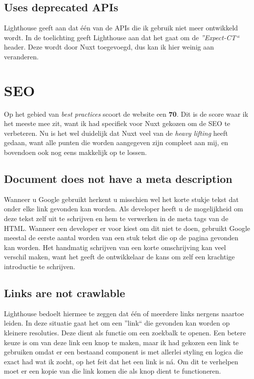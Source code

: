 \documentclass[a4paper]{report}
\begin{document}
    \subsection{Uses deprecated APIs}
    Lighthouse geeft aan dat één van de APIs die ik gebruik niet meer ontwikkeld wordt.
    In de toelichting geeft Lighthouse aan dat het gaat om de \textit{''Expect-CT``} header. Deze wordt door Nuxt toegevoegd, dus kan ik hier weinig aan veranderen.

    \section{SEO}
    Op het gebied van \textit{best practices} scoort de website een \textbf{70}.
    Dit is de score waar ik het meeste mee zit, want ik had specifiek voor Nuxt gekozen om de SEO te verbeteren.
    Nu is het wel duidelijk dat Nuxt veel van de \textit{heavy lifting} heeft gedaan, want alle punten die worden aangegeven zijn compleet aan mij,
    en bovendoen ook nog eens makkelijk op te lossen.

    \subsection{Document does not have a meta description}
    Wanneer u Google gebruikt herkent u misschien wel het korte stukje tekst dat onder elke link gevonden kan worden.
    Als developer heeft u de mogelijkheid om deze tekst zelf uit te schrijven en hem te verwerken in de {\selectfont meta} tags van de HTML.
    Wanneer een developer er voor kiest om dit niet te doen, gebruikt Google meestal de eerste aantal worden van een stuk tekst die op de pagina gevonden kan worden.
    Het handmatig schrijven van een korte omschrijving kan veel verschil maken, want het geeft de ontwikkelaar de kans om zelf een krachtige introductie te schrijven.

    \subsection{Links are not crawlable}
    Lighthouse bedoelt hiermee te zeggen dat één of meerdere links nergens naartoe leiden. In deze situatie gaat het om een ''link``
    die gevonden kan worden op kleinere resoluties. Deze dient als functie om een zoekbalk te openen. Een betere keuze is om van deze link een knop te maken,
    maar ik had gekozen een link te gebruiken omdat er een bestaand component is met allerlei styling en logica die exact had wat ik zocht, op het feit dat het een
    link is ná. Om dit te verhelpen moet er een kopie van die link komen die als knop dient te functioneren.
\end{document}
